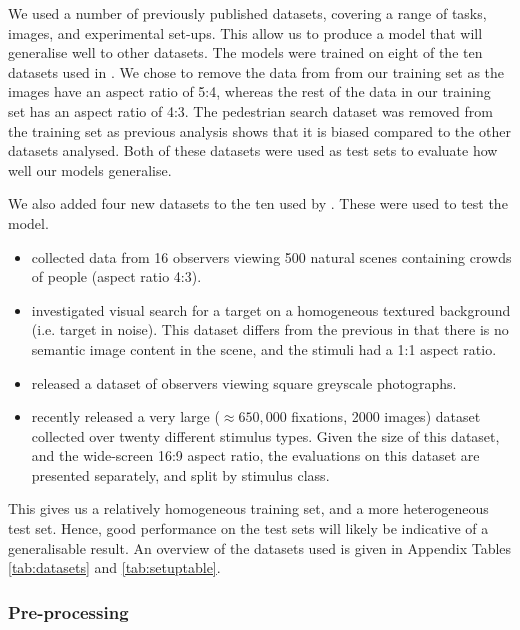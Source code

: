 \documentclass[a4paper, twocolumn, oneside, 11pt]{article}
\begin{document}
We used a number of previously published datasets, covering a range of tasks, images, and experimental set-ups. This allow us to produce a model that will generalise well to other datasets. The models were trained on eight of the ten datasets used in \cite{clarke-tatler2014}. We chose to remove the data from \cite{asher2013} from our training set as the images have an aspect ratio of 5:4, whereas the rest of the data in our training set has an aspect ratio of 4:3. The pedestrian search dataset \citep{ehinger2009} was removed from the training set as previous analysis \citep{clarke-tatler2014} shows that it is biased compared to the other datasets analysed. Both of these datasets were used as test sets to evaluate how well our models generalise. 

We also added four new datasets to the ten used by \cite{clarke-tatler2014}. These were used to test the model. 

\begin{itemize}

\item \cite{jiang2014} collected data from 16 observers viewing 500 natural scenes containing crowds of people (aspect ratio 4:3).

\item \cite{clarke2009} investigated visual search for a target on a homogeneous textured background (i.e. target in noise). This dataset differs from the previous in that there is no semantic image content in the scene, and the stimuli had a 1:1 aspect ratio.

\item \cite{greene-wolfe2012} released a dataset of observers viewing square greyscale photographs.

\item \cite{borji2015} recently released a very large ($\approx 650,000$ fixations, 2000 images) dataset collected over twenty different stimulus types. Given the size of this dataset, and the wide-screen 16:9 aspect ratio, the evaluations on this dataset are presented separately, and split by stimulus class.
\end{itemize}
This gives us a relatively homogeneous training set, and a more heterogeneous test set. Hence, good performance on the test sets will likely be indicative of a generalisable result. An overview of the datasets used is given in Appendix Tables \ref{tab:datasets} and \ref{tab:setuptable}. 

\subsubsection{Pre-processing}
\end{document}
